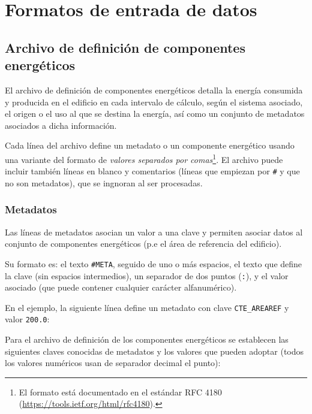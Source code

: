 \documentclass[10pt,notitlepage,oneside,a4paper]{article}
\begin{document}
\clearpage
\newpage
\section{Formatos de entrada de datos}

\subsection{Archivo de definición de componentes energéticos}\label{sec:formatocomponentes}

El archivo de definición de componentes energéticos detalla la energía consumida y producida en el edificio en cada intervalo de cálculo, según el sistema asociado, el origen o el uso al que se destina la energía, así como un conjunto de metadatos asociados a dicha información.

Cada línea del archivo define un metadato o un componente energético usando una variante del formato de \textit{valores separados por comas}\footnote{El formato está documentado en el estándar RFC 4180 (\url{https://tools.ietf.org/html/rfc4180}).}. El archivo puede incluir también líneas en blanco y comentarios (líneas que empiezan por \texttt{\#} y que no son metadatos), que se ingnoran al ser procesadas.



\subsubsection{Metadatos}

Las líneas de metadatos asocian un valor a una clave y permiten asociar datos al conjunto de componentes energéticos (p.e el área de referencia del edificio).

Su formato es: el texto \texttt{\#META}, seguido de uno o más espacios, el texto que define la clave (sin espacios intermedios), un separador de dos puntos (\texttt{:}), y el valor asociado (que puede contener cualquier carácter alfanumérico).

En el ejemplo, la siguiente línea define un metadato con clave \texttt{CTE\_AREAREF} y valor \texttt{200.0}:



Para el archivo de definición de los componentes energéticos se establecen las siguientes claves conocidas de metadatos y los valores que pueden adoptar (todos los valores numéricos usan de separador decimal el punto):
\end{document}
